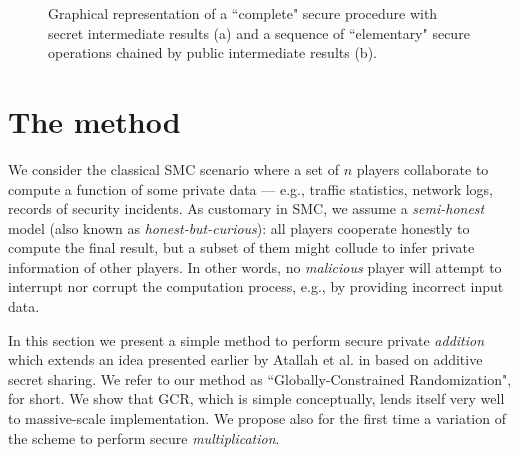 \documentclass{sig-alternate}
\begin{document}
\newcommand{\mipicwidth}{0.47\textwidth}
\begin{figure*}[tb]
\centering
{}
\caption{ Graphical representation of a ``complete" secure procedure with secret intermediate results (a) and a sequence of ``elementary" secure operations chained by public intermediate results (b). } 
\label{fig:whale-dolphin}
\end{figure*}


\section{The \ata method}

We consider the classical SMC scenario where a set of $n$ players collaborate to compute a function of some private data --- e.g., traffic statistics,  network logs, records of  security incidents.   
As customary in SMC, we assume a \emph{semi-honest} model (also known as \emph{honest-but-curious}):  {all} players cooperate honestly to compute the final result, but a subset of them might collude to infer private information of other players. 
In other words, no {\em malicious} player will attempt to interrupt nor corrupt the computation process, e.g., by providing incorrect input data.



In this section we present a simple method to perform secure private {\em addition} which extends an idea presented earlier by Atallah {et al.} in \cite[\S4.1]{Atallah04} based on additive secret sharing.
We refer to our method as ``Globally-Constrained Randomization", \ata for short. 
We show that
GCR, which is simple conceptually, lends itself very well to massive-scale implementation.
We propose also for the first time a variation of the scheme to perform secure {\em multiplication}.
\end{document}
